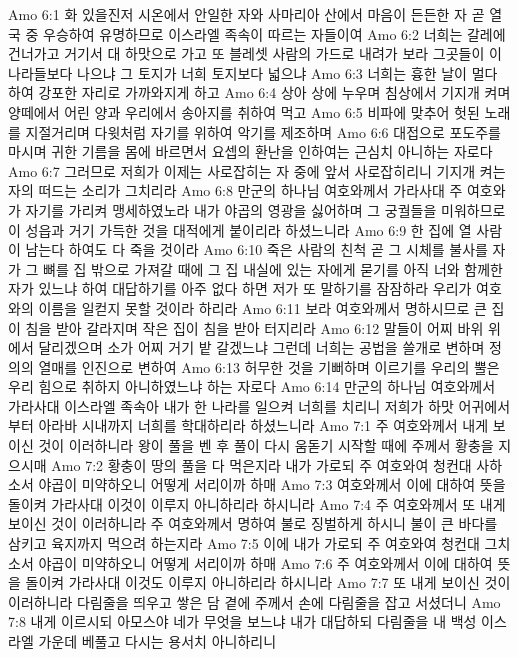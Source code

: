 Amo 6:1  화 있을진저 시온에서 안일한 자와 사마리아 산에서 마음이 든든한 자 곧 열국 중 우승하여 유명하므로 이스라엘 족속이 따르는 자들이여
Amo 6:2  너희는 갈레에 건너가고 거기서 대 하맛으로 가고 또 블레셋 사람의 가드로 내려가 보라 그곳들이 이 나라들보다 나으냐 그 토지가 너희 토지보다 넓으냐
Amo 6:3  너희는 흉한 날이 멀다 하여 강포한 자리로 가까와지게 하고
Amo 6:4  상아 상에 누우며 침상에서 기지개 켜며 양떼에서 어린 양과 우리에서 송아지를 취하여 먹고
Amo 6:5  비파에 맞추어 헛된 노래를 지절거리며 다윗처럼 자기를 위하여 악기를 제조하며
Amo 6:6  대접으로 포도주를 마시며 귀한 기름을 몸에 바르면서 요셉의 환난을 인하여는 근심치 아니하는 자로다
Amo 6:7  그러므로 저희가 이제는 사로잡히는 자 중에 앞서 사로잡히리니 기지개 켜는 자의 떠드는 소리가 그치리라
Amo 6:8  만군의 하나님 여호와께서 가라사대 주 여호와가 자기를 가리켜 맹세하였노라 내가 야곱의 영광을 싫어하며 그 궁궐들을 미워하므로 이 성읍과 거기 가득한 것을 대적에게 붙이리라 하셨느니라
Amo 6:9  한 집에 열 사람이 남는다 하여도 다 죽을 것이라
Amo 6:10  죽은 사람의 친척 곧 그 시체를 불사를 자가 그 뼈를 집 밖으로 가져갈 때에 그 집 내실에 있는 자에게 묻기를 아직 너와 함께한 자가 있느냐 하여 대답하기를 아주 없다 하면 저가 또 말하기를 잠잠하라 우리가 여호와의 이름을 일컫지 못할 것이라 하리라
Amo 6:11  보라 여호와께서 명하시므로 큰 집이 침을 받아 갈라지며 작은 집이 침을 받아 터지리라
Amo 6:12  말들이 어찌 바위 위에서 달리겠으며 소가 어찌 거기 밭 갈겠느냐 그런데 너희는 공법을 쓸개로 변하며 정의의 열매를 인진으로 변하여
Amo 6:13  허무한 것을 기뻐하며 이르기를 우리의 뿔은 우리 힘으로 취하지 아니하였느냐 하는 자로다
Amo 6:14  만군의 하나님 여호와께서 가라사대 이스라엘 족속아 내가 한 나라를 일으켜 너희를 치리니 저희가 하맛 어귀에서부터 아라바 시내까지 너희를 학대하리라 하셨느니라
Amo 7:1  주 여호와께서 내게 보이신 것이 이러하니라 왕이 풀을 벤 후 풀이 다시 움돋기 시작할 때에 주께서 황충을 지으시매
Amo 7:2  황충이 땅의 풀을 다 먹은지라 내가 가로되 주 여호와여 청컨대 사하소서 야곱이 미약하오니 어떻게 서리이까 하매
Amo 7:3  여호와께서 이에 대하여 뜻을 돌이켜 가라사대 이것이 이루지 아니하리라 하시니라
Amo 7:4  주 여호와께서 또 내게 보이신 것이 이러하니라 주 여호와께서 명하여 불로 징벌하게 하시니 불이 큰 바다를 삼키고 육지까지 먹으려 하는지라
Amo 7:5  이에 내가 가로되 주 여호와여 청컨대 그치소서 야곱이 미약하오니 어떻게 서리이까 하매
Amo 7:6  주 여호와께서 이에 대하여 뜻을 돌이켜 가라사대 이것도 이루지 아니하리라 하시니라
Amo 7:7  또 내게 보이신 것이 이러하니라 다림줄을 띄우고 쌓은 담 곁에 주께서 손에 다림줄을 잡고 서셨더니
Amo 7:8  내게 이르시되 아모스야 네가 무엇을 보느냐 내가 대답하되 다림줄을 내 백성 이스라엘 가운데 베풀고 다시는 용서치 아니하리니
